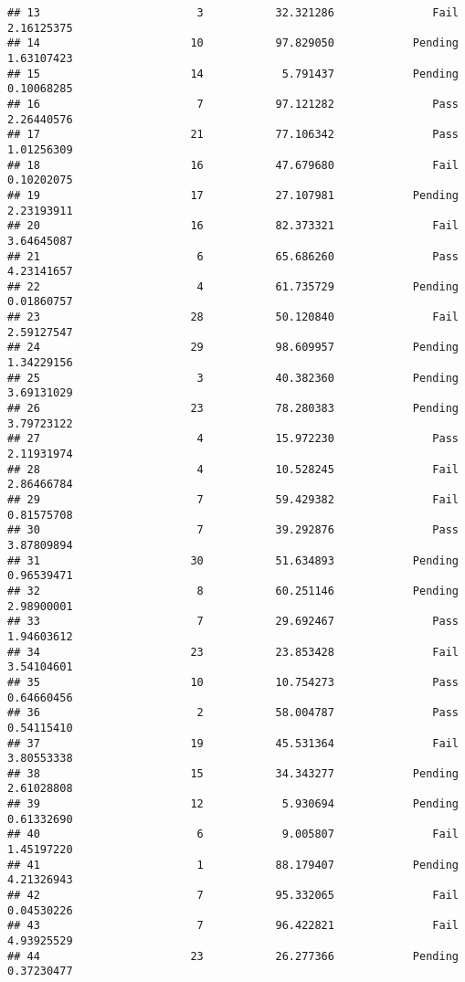 \documentclass[
]{article}
\begin{document}
\begin{verbatim}
## 13                        3           32.321286               Fail   2.16125375
## 14                       10           97.829050            Pending   1.63107423
## 15                       14            5.791437            Pending   0.10068285
## 16                        7           97.121282               Pass   2.26440576
## 17                       21           77.106342               Pass   1.01256309
## 18                       16           47.679680               Fail   0.10202075
## 19                       17           27.107981            Pending   2.23193911
## 20                       16           82.373321               Fail   3.64645087
## 21                        6           65.686260               Pass   4.23141657
## 22                        4           61.735729            Pending   0.01860757
## 23                       28           50.120840               Fail   2.59127547
## 24                       29           98.609957            Pending   1.34229156
## 25                        3           40.382360            Pending   3.69131029
## 26                       23           78.280383            Pending   3.79723122
## 27                        4           15.972230               Pass   2.11931974
## 28                        4           10.528245               Fail   2.86466784
## 29                        7           59.429382               Fail   0.81575708
## 30                        7           39.292876               Pass   3.87809894
## 31                       30           51.634893            Pending   0.96539471
## 32                        8           60.251146            Pending   2.98900001
## 33                        7           29.692467               Pass   1.94603612
## 34                       23           23.853428               Fail   3.54104601
## 35                       10           10.754273               Pass   0.64660456
## 36                        2           58.004787               Pass   0.54115410
## 37                       19           45.531364               Fail   3.80553338
## 38                       15           34.343277            Pending   2.61028808
## 39                       12            5.930694            Pending   0.61332690
## 40                        6            9.005807               Fail   1.45197220
## 41                        1           88.179407            Pending   4.21326943
## 42                        7           95.332065               Fail   0.04530226
## 43                        7           96.422821               Fail   4.93925529
## 44                       23           26.277366            Pending   0.37230477

\end{verbatim}
\end{document}
